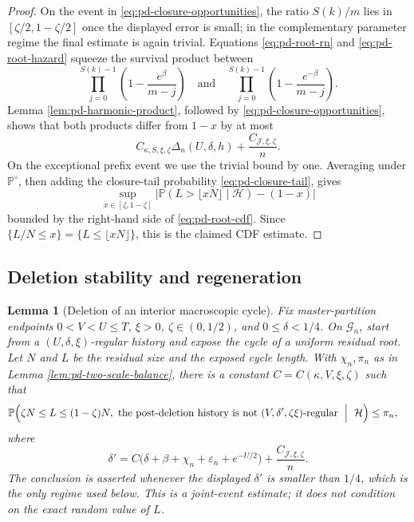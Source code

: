 \documentclass[11pt]{article}
\newtheorem{lemma}[theorem]{Lemma}
\theoremstyle{remark}
\newcommand{\Pp}{\mathbb P}
\begin{document}
\begin{proof}
On the event in \eqref{eq:pd-closure-opportunities}, the ratio
$S(k)/m$ lies in $[\zeta/2,1-\zeta/2]$ once the displayed error is small; in the
complementary parameter regime the final estimate is again trivial.  Equations
\eqref{eq:pd-root-rn} and \eqref{eq:pd-root-hazard} squeeze the survival
product between
\[
 \prod_{j=0}^{S(k)-1}\left(1-\frac{e^\beta}{m-j}\right)
 \quad\text{and}\quad
 \prod_{j=0}^{S(k)-1}\left(1-\frac{e^{-\beta}}{m-j}\right).
\]
Lemma \ref{lem:pd-harmonic-product}, followed by
\eqref{eq:pd-closure-opportunities}, shows that both products differ from
$1-x$ by at most
\[
 C_{\kappa,S,\xi,\zeta}
 \Delta_n(U,\delta,h)+\frac{C_{\mathcal J,\xi,\zeta}}n.
\]
On the exceptional prefix event we use the trivial bound by one.  Averaging
under $\Pp^\circ$, then adding the closure-tail probability
\eqref{eq:pd-closure-tail}, gives
\[
 \sup_{x\in[\zeta,1-\zeta]}
 \left|\Pp(L>\lfloor xN\rfloor\mid\mathcal H)-(1-x)\right|
\]
bounded by the right-hand side of \eqref{eq:pd-root-cdf}.  Since
$\{L/N\le x\}=\{L\le\lfloor xN\rfloor\}$, this is the claimed CDF estimate.
\end{proof}

\subsection{Deletion stability and regeneration}

\begin{lemma}[Deletion of an interior macroscopic cycle]
\label{lem:pd-deletion-stability}
Fix master-partition endpoints $0<V<U\le T$, $\xi>0$,
$\zeta\in(0,1/2)$, and $0\le\delta<1/4$.  On $\mathcal G_n$, start from a
$(U,\delta,\xi)$-regular history and expose the cycle of a uniform residual
root.  Let $N$ and $L$ be the residual size and the exposed cycle length.  With
$\chi_n,\pi_n$ as in Lemma \ref{lem:pd-two-scale-balance}, there is a constant
$C=C(\kappa,V,\xi,\zeta)$ such that
\begin{align}
&\Pp\Bigl(
 \zeta N\le L\le(1-\zeta)N,\ 
 \text{the post-deletion history is not }
 (V,\delta',\zeta\xi)\text{-regular}
 \ \Bigm|\ \mathcal H\Bigr)
 \le\pi_n,
 \label{eq:pd-deletion-joint}
\end{align}
where
\begin{equation}
 \delta'
 =C\bigl(\delta+\beta+\chi_n+\varepsilon_n+e^{-U/2}\bigr)
  +\frac{C_{\mathcal J,\xi,\zeta}}n.
 \label{eq:pd-deletion-error}
\end{equation}
The conclusion is asserted whenever the displayed $\delta'$ is smaller than
$1/4$, which is the only regime used below.  This is a joint-event estimate; it
does not condition on the exact random value of $L$.
\end{lemma}
\end{document}
